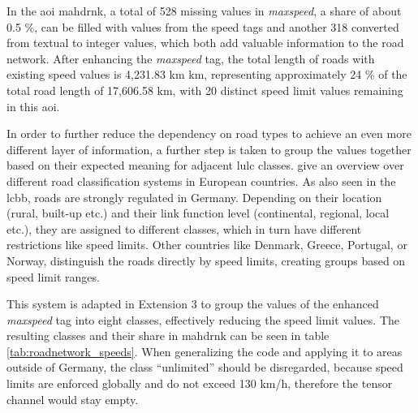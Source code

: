 In the \gls{aoi} \gls{mahdrnk}, a total of 528 missing values in \emph{maxspeed}, a share of about 0.5 \%, can be filled with values from the speed tags and another 318 converted from textual to integer values, which both add valuable information to the road network. After enhancing the \emph{maxspeed} tag, the total length of roads with existing speed values is 4,231.83 km km, representing approximately 24 \% of the total road length of 17,606.58 km, with 20 distinct speed limit values remaining in this \gls{aoi}.

In order to further reduce the dependency on road types to achieve an even more different layer of information, a further step is taken to group the values together based on their expected meaning for adjacent \gls{lulc} classes. \textcite{Vitkiene.Puodziukas.ea2017} give an overview over different road classification systems in European countries. As also seen in the \gls{lcbb}, roads are strongly regulated in Germany. Depending on their location (rural, built-up etc.) and their link function level (continental, regional, local etc.), they are assigned to different classes, which in turn have different restrictions like speed limits. Other countries like Denmark, Greece, Portugal, or Norway, distinguish the roads directly by speed limits, creating groups based on speed limit ranges.

This system is adapted in Extension 3 to group the values of the enhanced \emph{maxspeed} tag into eight classes, effectively reducing the speed limit values. The resulting classes and their share in \gls{mahdrnk} can be seen in table \ref{tab:roadnetwork_speeds}. When generalizing the code and applying it to areas outside of Germany, the class \enquote{unlimited} should be disregarded, because speed limits are enforced globally and do not exceed 130 km/h, therefore the tensor channel would stay empty.

